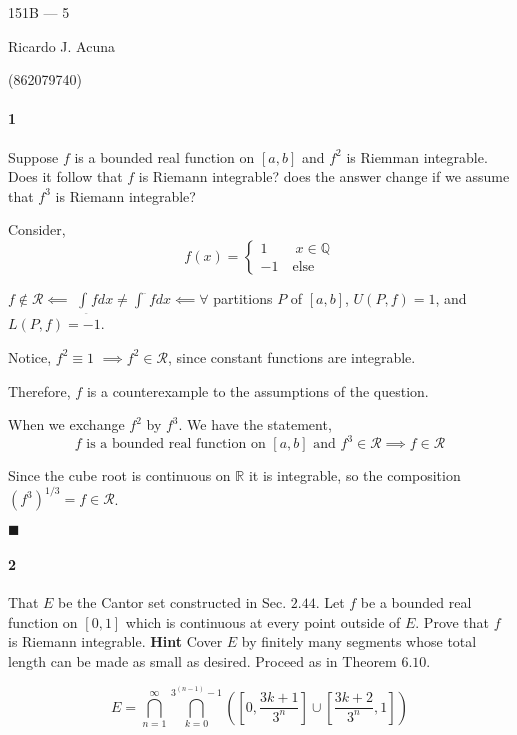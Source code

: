\documentclass{article}
\newcommand\Q{\mathbb{Q}}
\newcommand\R{\mathbb{R}}
\begin{document}
\begin{center}
  151B --- 5

  Ricardo J. Acuna

  (862079740)
\end{center}\vspace{1.618em}

\paragraph{1} Suppose $f$ is a bounded real function on $[a,b]$ and
$f^2$ is Riemman integrable. Does it follow  that $f$ is Riemann
integrable? does the answer change if we assume that $f^3$ is Riemann integrable?


Consider,
\[f(x) = \begin{cases} 1\quad\quad  x \in \Q \\ -1\quad
    \text{else} \end{cases}\]

$f\not\in \mathcal{R} \impliedby$ $\int_{\underbar{}} f dx \neq
\int^{\bar{} } f dx \impliedby \forall$ partitions $P$ of $[a,b]$, $U(P,f)=
1$, and $L(P,f)= -1$.


Notice, $f^2 \equiv 1$ $\implies f^2 \in \mathcal{R}$, since constant
functions are integrable.

Therefore, $f$ is a counterexample to the assumptions of the question.


When we exchange $f^2$ by $f^3$. We have the statement,
\[f\text{ is a bounded real function on }[a,b]\text{ and
  }f^3\in\mathscr{R} \implies f\in \mathscr{R} \]

Since the cube root is continuous on $\R$ it is integrable, so the
composition $(f^3)^{1/3} = f \in\mathscr{R}$.

$\blacksquare$

\paragraph{2} That $E$ be the Cantor set constructed in
Sec. $2.44$. Let $f$ be a bounded real function on $[0,1]$ which is
continuous at every point outside of $E$. Prove that $f$ is Riemann
integrable.
\textbf{Hint} Cover $E$ by finitely many segments whose total length can be made as small as
desired. Proceed as in Theorem $6.10$.


$$E = \bigcap_{n=1}^\infty \bigcap_{k = 0}^{3^{(n-1)} -1} \left(
  \left[ 0, \frac{3k+1}{3^n} \right] \cup \left[ \frac{3k+2}{3^n}, 1\right]\right)$$
\end{document}

